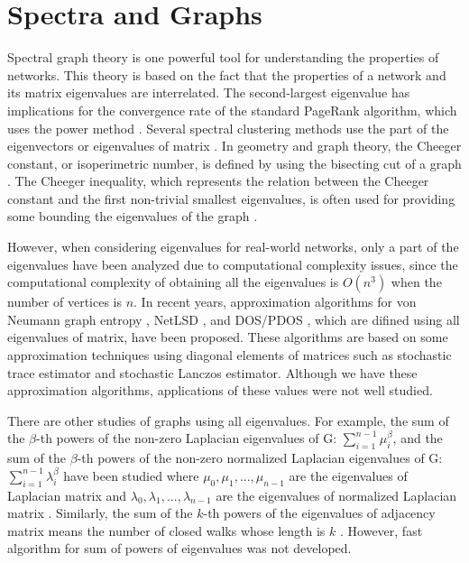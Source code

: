 \documentclass[senior,final,11pt]{iscs-thesis}
\begin{document}
\section{Spectra and Graphs}
Spectral graph theory is one powerful tool for understanding the properties of networks. This theory is based on the fact that the properties of a network and its matrix eigenvalues are interrelated.
The second-largest eigenvalue has implications for the convergence rate of the standard PageRank \cite{page1999pagerank} algorithm, which uses the power method \cite{haveliwala2003second}.
Several spectral clustering methods use the part of the eigenvectors or eigenvalues of matrix \cite{ng2002spectral}.
In geometry and graph theory, the Cheeger constant, or isoperimetric number, is defined by using the bisecting cut of a graph \cite{cheeger1969lower, mohar1989isoperimetric}. The Cheeger inequality, which represents the relation between the Cheeger constant and the first non-trivial smallest eigenvalues, is often used for providing some bounding the eigenvalues of the graph \cite{chung1997spectral}.

However, when considering eigenvalues for real-world networks, only a part of the eigenvalues have been analyzed due to computational complexity issues, since the computational complexity of obtaining all the eigenvalues is $O(n^3)$ when the number of vertices is $n$. In recent years, approximation algorithms for von Neumann graph entropy \cite{chen2019fast, tsitsulin2020just}, NetLSD \cite{tsitsulin2018netlsd,tsitsulin2020just}, and DOS/PDOS \cite{dong2019network}, which are difined using all eigenvalues of matrix, have been proposed. These algorithms are based on some approximation techniques using diagonal elements of matrices such as stochastic trace estimator\cite{hutchinson1989stochastic} and stochastic Lanczos estimator\cite{ ubaru2017fast}. Although we have these approximation algorithms, applications of these values were not well studied.

There are other studies of graphs using all eigenvalues. For example, the sum of the $\beta$-th powers of the non-zero Laplacian eigenvalues of G: $\sum_{i=1}^{n-1}\mu_i^\beta$, and the sum of the $\beta$-th powers of the non-zero normalized Laplacian eigenvalues of G: $\sum_{i=1}^{n-1}\lambda_i^\beta$ have been studied where $\mu_0, \mu_1, ..., \mu_{n-1}$ are the eigenvalues of Laplacian matrix and $\lambda_0, \lambda_1, ..., \lambda_{n-1}$ are the eigenvalues of normalized Laplacian matrix \cite{zhou2008sum, li2018bounding}. Similarly, the sum of the $k$-th powers of the eigenvalues of adjacency matrix means the number of closed walks whose length is $k$ \cite{butler2008eigenvalues}. However, fast algorithm for sum of powers of eigenvalues was not developed.
\end{document}
